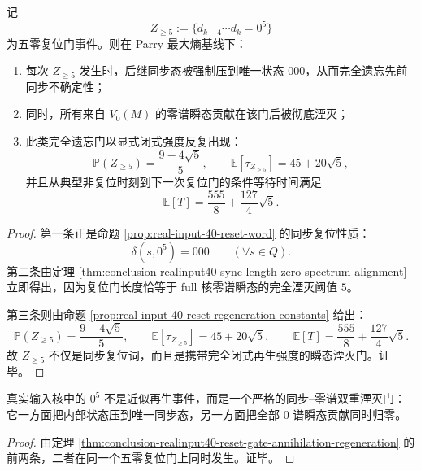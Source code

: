 \begin{theorem}\label{thm:conclusion-realinput40-reset-gate-annihilation-regeneration}
记
\[
Z_{\ge 5}:=\{d_{k-4}\cdots d_k=0^5\}
\]
为五零复位门事件。则在 Parry 最大熵基线下：
\begin{enumerate}
  \item 每次 \(Z_{\ge 5}\) 发生时，后继同步态被强制压到唯一状态 \(000\)，从而完全遗忘先前同步不确定性；
  \item 同时，所有来自 \(V_0(M)\) 的零谱瞬态贡献在该门后被彻底湮灭；
  \item 此类完全遗忘门以显式闭式强度反复出现：
  \[
  \mathbb P(Z_{\ge 5})=\frac{9-4\sqrt5}{5},
  \qquad
  \mathbb E[\tau_{Z_{\ge 5}}]=45+20\sqrt5,
  \]
  并且从典型非复位时刻到下一次复位门的条件等待时间满足
  \[
  \mathbb E[T]=\frac{555}{8}+\frac{127}{4}\sqrt5.
  \]
\end{enumerate}
\end{theorem}
\begin{proof}
第一条正是命题 \ref{prop:real-input-40-reset-word} 的同步复位性质：
\[
\delta(s,0^5)=000\qquad(\forall s\in Q).
\]
第二条由定理 \ref{thm:conclusion-realinput40-sync-length-zero-spectrum-alignment} 立即得出，因为复位门长度恰等于 full 核零谱瞬态的完全湮灭阈值 \(5\)。

第三条则由命题 \ref{prop:real-input-40-reset-regeneration-constants} 给出：
\[
\mathbb P(Z_{\ge 5})=\frac{9-4\sqrt5}{5},
\qquad
\mathbb E[\tau_{Z_{\ge 5}}]=45+20\sqrt5,
\qquad
\mathbb E[T]=\frac{555}{8}+\frac{127}{4}\sqrt5.
\]
故 \(Z_{\ge 5}\) 不仅是同步复位词，而且是携带完全闭式再生强度的瞬态湮灭门。证毕。
\end{proof}

\begin{corollary}[同步与零谱的双重湮灭门]\label{cor:conclusion-realinput40-sync-zero-spectrum-double-gate}
真实输入核中的 \(0^5\) 不是近似再生事件，而是一个严格的同步--零谱双重湮灭门：它一方面把内部状态压到唯一同步态，另一方面把全部 \(0\)-谱瞬态贡献同时归零。
\end{corollary}
\begin{proof}
由定理 \ref{thm:conclusion-realinput40-reset-gate-annihilation-regeneration} 的前两条，二者在同一个五零复位门上同时发生。证毕。
\end{proof}

